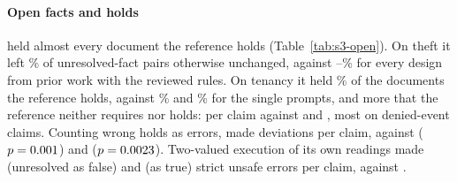 \paragraph{Open facts and holds}
\casepath held almost every document the reference holds (Table~\ref{tab:s3-open}). On theft it left \sthreeCasePathThOpenUnchanged\% of unresolved-fact pairs otherwise unchanged, against \sthreeRicThOpenUnchanged--\sthreeReactThOpenUnchanged\% for every design from prior work with the reviewed rules. On tenancy it held \sthreeCasePathTenCorrectHold\% of the documents the reference holds, against \sthreeRicTenCorrectHold\% and \sthreeRicFrontierTenCorrectHold\% for the single prompts, and more that the reference neither requires nor holds: \sthreeCasePathTenSpurHold{} per claim against \sthreeRicTenSpurHold{} and \sthreeRicFrontierTenSpurHold, most on denied-event claims. Counting wrong holds as errors, \casepath made \sthreeCasePathTenAllDev{} deviations per claim, against \sthreeRicTenAllDev{} ($p= 0.001$) and \sthreeRicFrontierTenAllDev{} ($p= 0.0023$). Two-valued execution of its own readings made \sthreeTwoValFalseTenStrict{} (unresolved as false) and \sthreeTwoValTrueTenStrict{} (as true) strict unsafe errors per claim, against \sthreeCasePathTenStrict.


